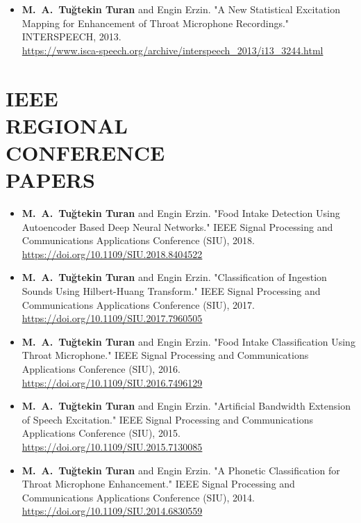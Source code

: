 \documentclass[margin, 10pt]{res} %
\begin{document}
\begin{resume}
\begin{itemize}[leftmargin=*]
    \item \textbf{M.~A.~Tu\u{g}tekin Turan} and Engin Erzin. "A New Statistical Excitation Mapping for Enhancement of Throat Microphone Recordings." INTERSPEECH, 2013. \\ \url{https://www.isca-speech.org/archive/interspeech_2013/i13_3244.html} \\
\end{itemize}

\section{IEEE \\ REGIONAL \\ CONFERENCE \\ PAPERS}

\begin{itemize}[leftmargin=*]
    \item \textbf{M.~A.~Tu\u{g}tekin Turan} and Engin Erzin. "Food Intake Detection Using Autoencoder Based Deep Neural Networks." IEEE Signal Processing and Communications Applications Conference (SIU), 2018. \\ \url{https://doi.org/10.1109/SIU.2018.8404522}

    \item \textbf{M.~A.~Tu\u{g}tekin Turan} and Engin Erzin. "Classification of Ingestion Sounds Using Hilbert-Huang Transform." IEEE Signal Processing and Communications Applications Conference (SIU), 2017. \\ \url{https://doi.org/10.1109/SIU.2017.7960505}

    \item \textbf{M.~A.~Tu\u{g}tekin Turan} and Engin Erzin. "Food Intake Classification Using Throat Microphone." IEEE Signal Processing and Communications Applications Conference (SIU), 2016. \url{https://doi.org/10.1109/SIU.2016.7496129}

    \item \textbf{M.~A.~Tu\u{g}tekin Turan} and Engin Erzin. "Artificial Bandwidth Extension of Speech Excitation." IEEE Signal Processing and Communications Applications Conference (SIU), 2015. \url{https://doi.org/10.1109/SIU.2015.7130085}

    \item \textbf{M.~A.~Tu\u{g}tekin Turan} and Engin Erzin. "A Phonetic Classification for Throat Microphone Enhancement." IEEE Signal Processing and Communications Applications Conference (SIU), 2014. \\ \url{https://doi.org/10.1109/SIU.2014.6830559}
\end{itemize}

\end{resume}
\end{document}
